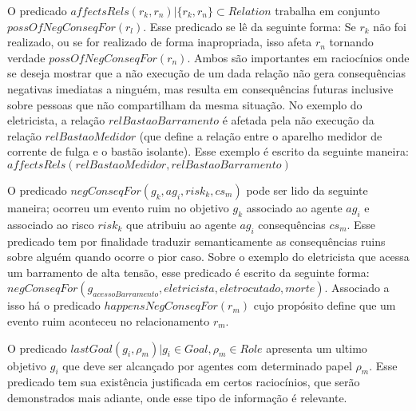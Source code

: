 O predicado $affectsRels(r_k,r_n) | \{ r_k, r_n\} \subset Relation $ trabalha em conjunto $possOfNegConseqFor(r_l)$. Esse predicado se lê da seguinte forma: Se $r_k$ não foi realizado, ou se for realizado de forma inapropriada, isso afeta  $r_n$ tornando verdade $possOfNegConseqFor(r_n)$. Ambos são importantes em raciocínios onde se deseja mostrar que a não execução de um dada relação não gera consequências negativas imediatas a ninguém, mas resulta em consequências futuras inclusive sobre pessoas que não compartilham da mesma situação. No exemplo do eletricista, a relação $relBastaoBarramento$ é afetada pela não execução da relação $relBastaoMedidor$ (que define a relação entre o aparelho medidor de corrente de fulga e o bastão isolante). Esse exemplo é escrito da seguinte maneira:$affectsRels(relBastaoMedidor,relBastaoBarramento)$

O predicado $negConseqFor(g_k, ag_i,risk_k,cs_m)$ pode ser lido da seguinte maneira; ocorreu um evento ruim no objetivo $g_k$ associado ao agente $ag_i$ e associado ao risco $risk_k$ que atribuiu ao agente $ag_i$ consequências $cs_m$. Esse predicado tem por finalidade traduzir semanticamente as consequências ruins sobre alguém quando ocorre o pior caso. Sobre o exemplo do eletricista que acessa um barramento de alta tensão, esse predicado é escrito da seguinte forma: $negConseqFor(g_{acessoBarramento}, eletricista,eletrocutado,morte)$. Associado a isso há o predicado $happensNegConseqFor(r_m)$ cujo propósito define que um evento ruim aconteceu no relacionamento $r_m$.

O predicado $lastGoal(g_i,\rho_m) | g_i \in Goal, \rho_m \in Role $ apresenta um ultimo objetivo $g_i$ que deve ser alcançado por agentes com determinado papel $\rho_{m}$. Esse predicado tem sua existência justificada em certos raciocínios, que serão demonstrados mais adiante, onde esse tipo de informação é relevante.
